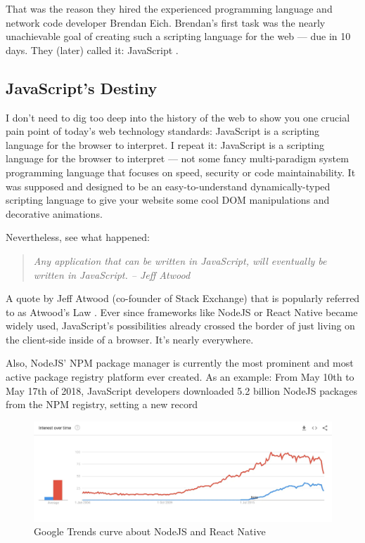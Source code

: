 \documentclass[10pt]{article}
\begin{document}
\begin{sloppypar}
  That was the reason they hired the experienced programming language and network code developer Brendan Eich. Brendan’s first task was the nearly unachievable goal of creating such a scripting language for the web — due in 10 days. They (later) called it: JavaScript \citep{severance_javascript_2012}.

  \subsection{JavaScript’s Destiny}
  \label{sec:javascript-destiny}

  I don’t need to dig too deep into the history of the web to show you one crucial pain point of today’s web technology standards: JavaScript is a scripting language for the browser to interpret. I repeat it: JavaScript is a scripting language for the browser to interpret — not some fancy multi-paradigm system programming language that focuses on speed, security or code maintainability. It was supposed and designed to be an easy-to-understand dynamically-typed scripting language to give your website some cool DOM manipulations and decorative animations.

  Nevertheless, see what happened:

  \begin{quote}
    \emph{Any application that can be written in JavaScript, will eventually be written in JavaScript. – Jeff Atwood}
  \end{quote}

  A quote by Jeff Atwood (co-founder of Stack Exchange) that is popularly referred to as Atwood’s Law \citep{atwood_principle_2007}. Ever since frameworks like NodeJS or React Native became widely used, JavaScript’s possibilities already crossed the border of just living on the client-side inside of a browser. It’s nearly everywhere.

  Also, NodeJS’ NPM package manager is currently the most prominent and most active package registry platform ever created. As an example: From May 10th to May 17th of 2018, JavaScript developers downloaded 5.2 billion NodeJS packages from the NPM registry, setting a new record \citep{inc_how_2018}

  \begin{figure}[ht]
    \centering
    \includegraphics[width=\textwidth]{figures/003.jpg}
    \caption{Google Trends curve about NodeJS and React Native}
    \label{fig:atwood-law}
  \end{figure}


\end{sloppypar}
\end{document}
